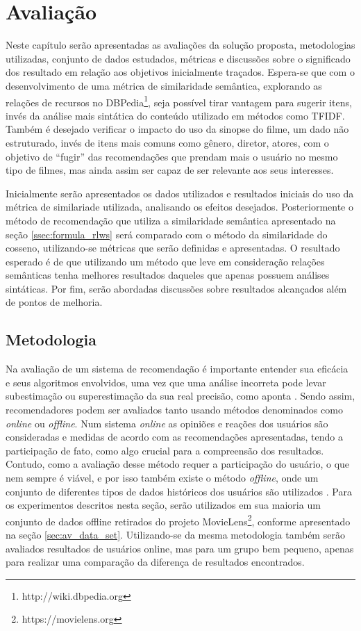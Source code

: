 \chapter{Avaliação}
\label{cap:evaluation}

Neste capítulo serão apresentadas as avaliações da solução proposta, metodologias utilizadas, conjunto de dados estudados, métricas e discussões sobre o significado dos resultado em relação aos objetivos inicialmente traçados. Espera-se que com o desenvolvimento de uma métrica de similaridade semântica, explorando as relações de recursos no DBPedia\footnote{http://wiki.dbpedia.org}, seja possível tirar vantagem para sugerir itens, invés da análise mais sintática do conteúdo utilizado em métodos como \ac{TFIDF}. Também é desejado verificar o impacto do uso da sinopse do filme, um dado não estruturado, invés de itens mais comuns como gênero, diretor, atores, com o objetivo de \enquote{fugir} das recomendações que prendam mais o usuário no mesmo tipo de filmes, mas ainda assim ser capaz de ser relevante aos seus interesses.

Inicialmente serão apresentados os dados utilizados e resultados iniciais do uso da métrica de similariade utilizada, analisando os efeitos desejados. Posteriormente o método de recomendação que utiliza a similaridade semântica apresentado na seção \ref{ssec:formula_rlws} será comparado com o método da similaridade do cosseno, utilizando-se métricas que serão definidas e apresentadas. O resultado esperado é de que utilizando um método que leve em consideração relações semânticas tenha melhores resultados daqueles que apenas possuem análises sintáticas. Por fim, serão abordadas discussões sobre resultados alcançados além de pontos de melhoria.

\section{Metodologia}
\label{sec:methodology}

Na avaliação de um sistema de recomendação é importante entender sua eficácia e seus algoritmos envolvidos, uma vez que uma análise incorreta pode levar subestimação ou superestimação da sua real precisão, como aponta \cite{Aggarwal2016:Evaluation}. Sendo assim, recomendadores podem ser avaliados tanto usando métodos denominados como \textit{online} ou \textit{offline}. Num sistema \textit{online} as opiniões e reações dos usuários são consideradas e medidas de acordo com as recomendações apresentadas, tendo a participação de fato, como algo crucial para a compreensão dos resultados. Contudo, como a avaliação desse método requer a participação do usuário, o que nem sempre é viável, e por isso também existe o método \textit{offline}, onde um conjunto de diferentes tipos de dados históricos dos usuários são utilizados \citep{Herlocker:1999}. Para os experimentos descritos nesta seção, serão utilizados em sua maioria um conjunto de dados offline retirados do projeto MovieLens\footnote{https://movielens.org}, conforme apresentado na seção \ref{sec:av_data_set}. Utilizando-se da mesma metodologia também serão avaliados resultados de usuários online, mas para um grupo bem pequeno, apenas para realizar uma comparação da diferença de resultados encontrados.

